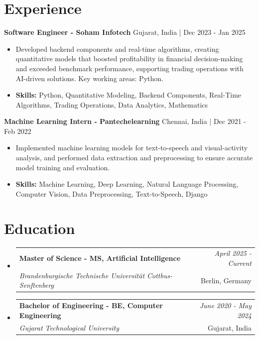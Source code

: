 \documentclass[a4paper,11pt]{article}
\makeatletter
\newcommand{\resumeSubheading}[4]{
\vspace{0.5mm}\item
    \begin{tabular*}{\linewidth}[t]{l@{\extracolsep{\fill}}r}
        \textbf{#1} & \textit{\footnotesize{#4}} \\
        \textit{\footnotesize{#3}} &  \footnotesize{#2}\\
    \end{tabular*}
    \vspace{-2.4mm}
}
\makeatother
\begin{document}
\section{\textbf{Experience}}


\vspace{1mm}
  \textbf{Software Engineer - Soham Infotech} \hfill Gujarat, India | Dec 2023 - Jan 2025
\vspace{-1.5mm} %
\begin{itemize}
  \item Developed backend components and real-time algorithms, creating quantitative models that boosted profitability in financial decision-making and exceeded benchmark performance, supporting trading operations with AI-driven solutions. Key working areas: Python.

\vspace{-2mm}
  \item \textbf{Skills:} Python, Quantitative Modeling, Backend Components, Real-Time Algorithms, Trading Operations, Data Analytics, Mathematics
\end{itemize}

\vspace{1mm}
  \textbf{Machine Learning Intern - Pantechelearning} \hfill Chennai, India | Dec 2021 - Feb 2022
\vspace{-1.5mm} %
\begin{itemize}
  \item Implemented machine learning models for text-to-speech and visual-activity analysis, and performed data extraction and preprocessing to ensure accurate model training and evaluation.
\vspace{-2mm}
  \item \textbf{Skills:} Machine Learning, Deep Learning, Natural Language Processing, Computer Vision, Data Preprocessing, Text-to-Speech, Django
\end{itemize}\section{\textbf{Education}}
\vspace{-0.4mm}

\begin{itemize}[leftmargin=0.15in, label={}]
\resumeSubheading
{Master of Science - MS, Artificial Intelligence }{Berlin, Germany}
{Brandenburgische Technische Universität Cottbus-Senftenberg  }{April 2025 - Current}

\vspace{1.0mm} %
\resumeSubheading
{Bachelor of Engineering - BE, Computer Engineering  }{Gujarat, India}
{Gujarat Technological University }{June 2020 - May 2024}

\end{itemize}
\end{document}
